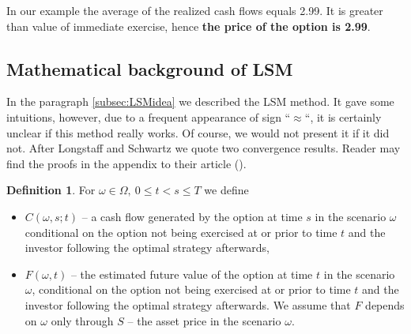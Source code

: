 \documentclass[a4paper,11pt, twoside]{book}
\theoremstyle{definition}
\newtheorem{mydef}{Definition}[chapter]
\theoremstyle{remark}
\newcounter{example}[chapter]
\begin{document}
In our example the average of the realized cash flows equals 2.99. It is greater than value of immediate exercise, hence \textbf{the price of the option is 2.99}.

\subsection{Mathematical background of LSM}
In the paragraph \ref{subsec:LSMidea} we described the LSM method. It gave some intuitions, however, due to a frequent appearance of sign ``$\approx$``, it is certainly unclear if this method really works. Of course, we would not present it if it did not. After Longstaff and Schwartz we quote two convergence results. Reader may find the proofs in the appendix to their article (\cite{l-sch}).

\begin{mydef}
 For $\omega \in \Omega,\ 0 \leq t < s \leq T$ we define 
 \begin{itemize}
  \item $C(\omega, s; t)$ -- a cash flow generated by the option at time $s$ in the scenario $\omega$ conditional on the option not being exercised at or prior to time $t$ and the investor following the optimal strategy afterwards,
  \item $F(\omega, t)$ -- the estimated future value of the option at time $t$ in the scenario $\omega$, conditional on the option not being exercised at or prior to time $t$ and the investor following the optimal strategy afterwards. We assume that $F$ depends on $\omega$ only through $S$ -- the asset price in the scenario $\omega$.
 \end{itemize}
\end{mydef}
\end{document}
